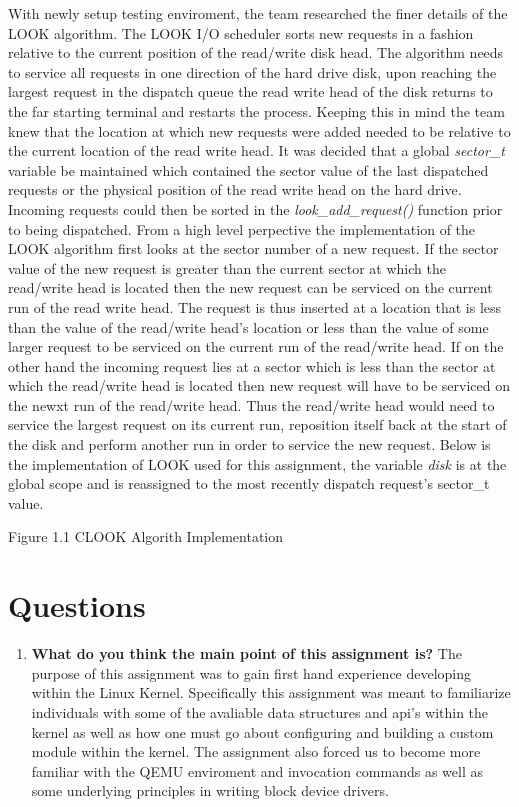 \documentclass[10pt,onecolumn,draftclsnofoot]{IEEEtran} %
\begin{document}
\begin{singlespace}
	\normalfont \indent With newly setup testing enviroment, the team researched the finer details of the LOOK algorithm. The LOOK I/O scheduler sorts new requests in a fashion relative to the current position of the read/write disk head. The algorithm needs to service all requests in one direction of the hard drive disk, upon reaching the largest request in the dispatch queue the read write head of the disk returns to the far starting terminal and restarts the process. Keeping this in mind the team knew that the location at which new requests were added needed to be relative to the current location of the read write head. It was decided that a global \textit{sector\_t} variable be maintained which contained the sector value of the last dispatched requests or the physical position of the read write head on the hard drive. Incoming requests could then be sorted in the \textit{look\_add\_request()} function prior to being dispatched. 
	\normalfont \indent From a high level perpective the implementation of the LOOK algorithm first looks at the sector number of a new request. If the sector value of the new request is greater than the current sector at which the read/write head is located then the new request can be serviced on the current run of the read write head. The request is thus inserted at a location that is less than the value of the read/write head's location or less than the value of some larger request to be serviced on the current run of the read/write head. If on the other hand the incoming request lies at a sector which is less than the sector at which the read/write head is located then new request will have to be serviced on the newxt run of the read/write head. Thus the read/write head would need to service the largest request on its current run, reposition itself back at the start of the disk and perform another run in order to service the new request. Below is the implementation of LOOK used for this assignment, the variable \textit{disk\head} is at the global scope and is reassigned to the most recently dispatch request's sector\_t value.
 

\begin{center}
Figure 1.1 CLOOK Algorith Implementation
\end{center}

\section{\bf Questions}
	
	\begin{enumerate}
	\item \textbf{What do you think the main point of this assignment is?}
	\normalfont \indent The purpose of this assignment was to gain first hand experience developing within the Linux Kernel. Specifically this assignment was meant to familiarize individuals with some of the avaliable data structures and api's within the kernel as well as how one must go about configuring and building a custom module within the kernel. The assignment also forced us to become more familiar with the QEMU enviroment and invocation commands as well as some underlying principles in writing block device drivers.
	

\end{enumerate}
\end{singlespace}
\end{document}
